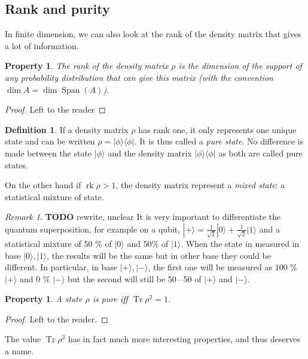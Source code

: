 \documentclass[10pt,a4paper]{report}
\theoremstyle{plain}
\newtheorem{prop}[thm]{Property}
\theoremstyle{definition}
\newtheorem{defn}{Definition}[chapter]
\theoremstyle{remark}
\newtheorem*{rem}{Remark}
\newcommand{\TODO}{\textbf{TODO}}
\newcommand{\ket}[1]{|#1\rangle}
\newcommand{\bra}[1]{\langle#1|}
\DeclareMathOperator{\Tr}{Tr}
\DeclareMathOperator{\rk}{rk}
\DeclareMathOperator{\Span}{Span}
\begin{document}
\subsection{Rank and purity}

In finite dimension, we can also look at the
rank of the density matrix that gives a lot of information.

\begin{prop}
  The rank of the density matrix $\rho$ is the dimension of the support of any
  probability distribution that can give this matrix
  (with the convention $\dim A = \dim \Span(A)$).
\end{prop}

\begin{proof}
  Left to the reader
\end{proof}

\begin{defn}
  If a density matrix $\rho$ has rank one, it only represents one unique state and can be written
  $\rho = \ket \phi \bra \phi$. It is thus called a \emph{pure state}. No
  difference is made between the state $\ket \phi$ and the density matrix $\ket
  \phi \bra \phi$ as both are called pure states.

  On the other hand if $\rk \rho > 1$, the density matrix represent a
  \emph{mixed state}: a statistical mixture of state.
\end{defn}

\begin{rem}
  \TODO{} rewrite, unclear
  It is very important to differentiate the quantum superposition, for example
  on a qubit,
  $\ket + = \frac1{\sqrt 2} \ket 0 + \frac1{\sqrt2} \ket 1$ and a statistical mixture of
  $50$ \% of $\ket 0$ and $50$\% of $\ket 1$. When the state in measured in base
  $\ket0,\ket1$, the results will be the same but in other base they could be
  different. In particular, in base $\ket +, \ket -$, the first one will be
  measured as $100$ \% $\ket +$ and $0$ \% $\ket -$ but the second will still be
  50\,--\,50 of $\ket+$ and $\ket -$.
\end{rem}

\begin{prop}
  A state $\rho$ is pure iff $\Tr \rho^2 = 1$.
\end{prop}

\begin{proof}
  Left to the reader.
\end{proof}

The value $\Tr \rho^2$ has in fact much more interesting properties, and thus
deserves a name.
\end{document}
